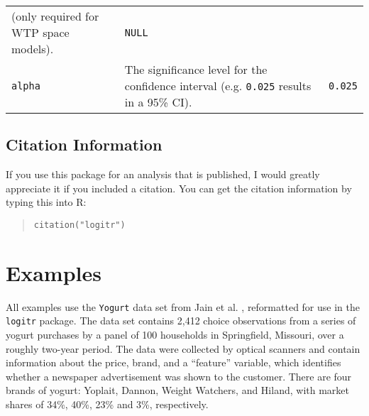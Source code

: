 \documentclass[article]{jss}
\begin{document}
\begin{longtable}[]{@{}lll@{}}
\begin{minipage}[t]{0.66\columnwidth}
(only required for WTP space models).\strut
\end{minipage} & \begin{minipage}[t]{0.11\columnwidth}\raggedright
\texttt{NULL}\strut
\end{minipage}\tabularnewline
\begin{minipage}[t]{0.14\columnwidth}\raggedright
\texttt{alpha}\strut
\end{minipage} & \begin{minipage}[t]{0.66\columnwidth}\raggedright
The significance level for the confidence interval (e.g. \texttt{0.025}
results in a 95\% CI).\strut
\end{minipage} & \begin{minipage}[t]{0.11\columnwidth}\raggedright
\texttt{0.025}\strut
\end{minipage}\tabularnewline
\bottomrule
\end{longtable}

\hypertarget{citation-information}{%
\subsection{Citation Information}\label{citation-information}}

If you use this package for an analysis that is published, I would
greatly appreciate it if you included a citation. You can get the
citation information by typing this into R:

\begin{quote}
\texttt{citation("logitr")}
\end{quote}

\hypertarget{examples}{%
\section{Examples}\label{examples}}

All examples use the \texttt{Yogurt} data set from Jain et al.
\citeyearpar{Jain1994}, reformatted for use in the \texttt{logitr}
package. The data set contains 2,412 choice observations from a series
of yogurt purchases by a panel of 100 households in Springfield,
Missouri, over a roughly two-year period. The data were collected by
optical scanners and contain information about the price, brand, and a
``feature'' variable, which identifies whether a newspaper advertisement
was shown to the customer. There are four brands of yogurt: Yoplait,
Dannon, Weight Watchers, and Hiland, with market shares of 34\%, 40\%,
23\% and 3\%, respectively.
\end{document}
